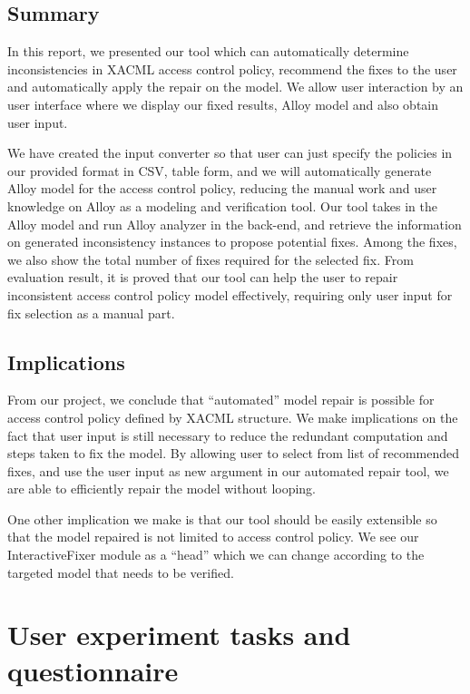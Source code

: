 \documentclass{acm_proc_article-sp}
\begin{document}
\subsection{Summary}
In this report, we presented our tool which can automatically determine inconsistencies in XACML access control policy, recommend the fixes to the user and automatically apply the repair on the model. We allow user interaction by an user interface where we display our fixed results, Alloy model and also obtain user input.

We have created the input converter so that user can just specify the policies in our provided format in CSV, table form, and we will automatically generate Alloy model for the access control policy, reducing the manual work and user knowledge on Alloy as a modeling and verification tool. Our tool takes in the Alloy model and run Alloy analyzer in the back-end, and retrieve the information on generated inconsistency instances to propose potential fixes. Among the fixes, we also show the total number of fixes required for the selected fix. From evaluation result, it is proved that our tool can help the user to repair inconsistent access control policy model effectively, requiring only user input for fix selection as a manual part. 

\subsection{Implications}

From our project, we conclude that ``automated'' model repair is possible for access control policy defined by XACML structure. We make implications on the fact that user input is still necessary to reduce the redundant computation and steps taken to fix the model. By allowing user to select from list of recommended fixes, and use the user input as new argument in our automated repair tool, we are able to efficiently repair the model without looping.

One other implication we make is that our tool should be easily extensible so that the model repaired is not limited to access control policy. We see our InteractiveFixer module as a ``head'' which we can change according to the targeted model that needs to be verified. 


{}


\appendix
\section{User experiment tasks and questionnaire} \label{A}
\end{document}
